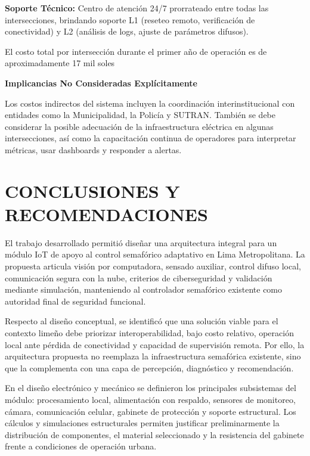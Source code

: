 \documentclass[12pt,a4paper,oneside]{report}
\begin{document}
\textbf{Soporte Técnico:} Centro de atención 24/7 prorrateado entre todas las intersecciones, brindando soporte L1 (reseteo remoto, verificación de conectividad) y L2 (análisis de logs, ajuste de parámetros difusos).

El costo total por intersección durante el primer año de operación es de aproximadamente 17 mil soles

\textbf{Implicancias No Consideradas Explícitamente}

Los costos indirectos del sistema incluyen la coordinación interinstitucional con entidades como la Municipalidad, la Policía y SUTRAN. También se debe considerar la posible adecuación de la infraestructura eléctrica en algunas intersecciones, así como la capacitación continua de operadores para interpretar métricas, usar dashboards y responder a alertas.

\chapter*{CONCLUSIONES Y RECOMENDACIONES}\label{conclusiones-y-observaciones}

El trabajo desarrollado permitió diseñar una arquitectura integral para un módulo IoT de apoyo al control semafórico adaptativo en Lima Metropolitana. La propuesta articula visión por computadora, sensado auxiliar, control difuso local, comunicación segura con la nube, criterios de ciberseguridad y validación mediante simulación, manteniendo al controlador semafórico existente como autoridad final de seguridad funcional.

Respecto al diseño conceptual, se identificó que una solución viable para el contexto limeño debe priorizar interoperabilidad, bajo costo relativo, operación local ante pérdida de conectividad y capacidad de supervisión remota. Por ello, la arquitectura propuesta no reemplaza la infraestructura semafórica existente, sino que la complementa con una capa de percepción, diagnóstico y recomendación.

En el diseño electrónico y mecánico se definieron los principales subsistemas del módulo: procesamiento local, alimentación con respaldo, sensores de monitoreo, cámara, comunicación celular, gabinete de protección y soporte estructural. Los cálculos y simulaciones estructurales permiten justificar preliminarmente la distribución de componentes, el material seleccionado y la resistencia del gabinete frente a condiciones de operación urbana.
\end{document}
